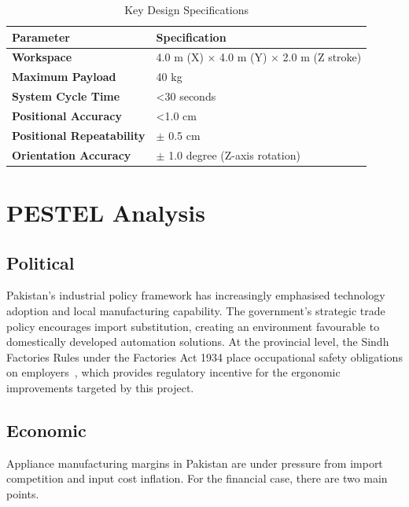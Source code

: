\begin{table}[H]
  \centering
  \caption{Key Design Specifications}
  \label{tab:specs}
  \begin{tabular}{@{}ll@{}}
    \toprule
    \textbf{Parameter} & \textbf{Specification} \\
    \midrule
    \textbf{Workspace} & 4.0 m (X) $\times$ 4.0 m (Y) $\times$ 2.0 m (Z stroke) \\
    \addlinespace
    \textbf{Maximum Payload} & 40 kg  \\
    \addlinespace
    \textbf{System Cycle Time} & \textless 30 seconds \\
    \addlinespace
    \textbf{Positional Accuracy} & \textless 1.0 cm \\
    \addlinespace
    \textbf{Positional Repeatability} & $\pm$ 0.5 cm \\
    \addlinespace
    \textbf{Orientation Accuracy} & $\pm$ 1.0 degree (Z-axis rotation) \\
    \bottomrule
  \end{tabular}
\end{table}

\section{PESTEL Analysis}

\subsection{Political}

Pakistan's industrial policy framework has increasingly emphasised technology adoption and local manufacturing capability. The government's strategic trade policy encourages import substitution, creating an environment favourable to domestically developed automation solutions. At the provincial level, the Sindh Factories Rules under the Factories Act 1934 place occupational safety obligations on employers~\cite{factories_act}, which provides regulatory incentive for the ergonomic improvements targeted by this project.

\subsection{Economic}

Appliance manufacturing margins in Pakistan are under pressure from import competition and input cost inflation. For the financial case, there are two main points.

